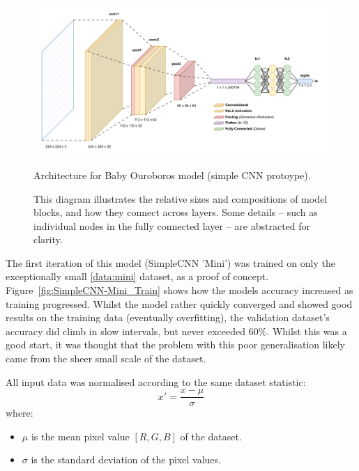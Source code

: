                 \begin{figure}[htbp]
                    \centering
                    \includegraphics[width=\linewidth]{images/BabyOuroboros.pdf}
                    \caption{Architecture for Baby Ouroboros model (simple CNN protoype).}
                    \caption*{This diagram illustrates the relative sizes and compositions of model blocks, and how they connect across layers. Some details -- such as individual nodes in the fully connected layer -- are abstracted for clarity.}
                    \label{fig:BabyOuroboros}
                \end{figure}
    
                The first iteration of this model (SimpleCNN 'Mini') was trained on only the exceptionally small \ref{data:mini} dataset, as a proof of concept. Figure~\ref{fig:SimpleCNN-Mini_Train} shows how the models accuracy increased as training progressed. Whilst the model rather quickly converged and showed good results on the training data (eventually overfitting), the validation dataset's accuracy did climb in slow intervals, but never exceeded 60\%. Whilst this was a good start, it was thought that the problem with this poor generalisation likely came from the sheer small scale of the dataset.
    
                All input data was normalised according to the same dataset statistic:
                    \[
                    x' = \frac{x - \mu}{\sigma}
                    \]
                where:
                    \begin{itemize}
                        \item \( \mu \) is the mean pixel value \([R,G,B]\) of the dataset.
                        \item \( \sigma \) is the standard deviation of the pixel values.
                    \end{itemize}
    
